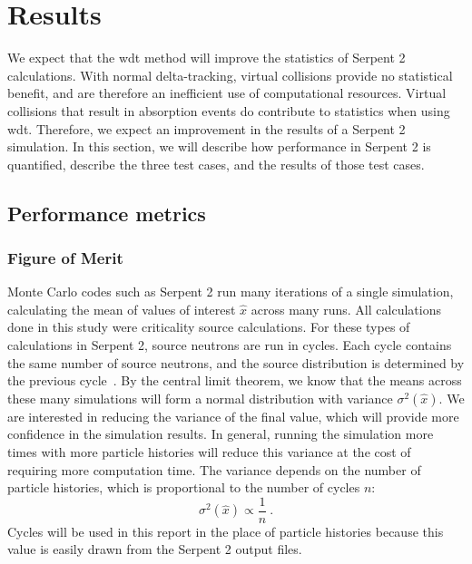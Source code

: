 \chapter{Results}
\label{chap:results}
We expect that the \gls{wdt} method will improve the statistics of
Serpent 2 calculations. With normal delta-tracking, virtual collisions
provide no statistical benefit, and are therefore an inefficient use
of computational resources. Virtual collisions that result in
absorption events do contribute to statistics when using
\gls{wdt}. Therefore, we expect an improvement in the results of a
Serpent 2 simulation. In this section, we will describe how
performance in Serpent 2 is quantified, describe the three test cases,
and the results of those test cases.

\section{Performance metrics}
\label{sec:fom}

\subsection{Figure of Merit}
\label{sec:fom}

Monte Carlo codes such as Serpent 2 run many iterations of a single
simulation, calculating the mean of values of interest $\hat{x}$
across many runs. All calculations done in this study were criticality
source calculations. For these types of calculations in Serpent 2,
source neutrons are run in cycles. Each cycle contains the same number
of source neutrons, and the source distribution is determined by the
previous cycle~\cite{jaakko2015}.
By the central limit theorem, we know that the means across these many
simulations will form a normal distribution with variance
$\sigma^2(\hat{x})$. We are interested in reducing the variance of the
final value, which will provide more confidence in the simulation
results. In general, running the simulation more times with more
particle histories will reduce this variance at the cost of requiring
more computation time. The variance depends on the number of
particle histories, which is proportional to the number of cycles $n$:
\begin{equation}
\label{eq:variance}
  \sigma^2(\hat{x}) \propto \frac{1}{n}\:.
\end{equation}
Cycles will be used in this report in the place of particle histories
because this value is easily drawn from the Serpent 2 output files.

